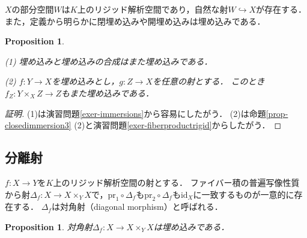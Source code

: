 \documentclass[a4paper,12pt, dvipdfmx]{jsbook}
\def\id{\mathrm{id}}
\theoremstyle{plain}
\newtheorem{prop}[thm]{\bfseries Proposition}
\theoremstyle{definition}
\begin{document}
$X$の部分空間$W$は$K$上のリジッド解析空間であり，自然な射$W\hookrightarrow X$が存在する．
また，定義から明らかに閉埋め込みや開埋め込みは埋め込みである．

\begin{prop}\label{prop-immersion3}{\rm 
(1) 埋め込みと埋め込みの合成はまた埋め込みである．

(2) $f\colon Y\rightarrow X$を埋め込みとし，$g\colon Z\rightarrow X$を任意の射とする．
このとき$f_Z\colon Y\times_XZ\rightarrow Z$もまた埋め込みである．}
\end{prop}

\begin{proof}[証明]
(1)は演習問題\ref{exer-immersions}から容易にしたがう．
(2)は命題\ref{prop-closedimmersion3} (2)と演習問題\ref{exer-fiberproductrigid}からしたがう．
\end{proof}

\subsection{分離射}\label{sub-separatedmorphisms}
$f\colon X\rightarrow Y$を$K$上のリジッド解析空間の射とする．
ファイバー積の普遍写像性質から射$\Delta_f\colon X\rightarrow X\times_YX$で，$\mathrm{pr}_1\circ\Delta_f$も$\mathrm{pr}_2\circ\Delta_f$も$\id_X$に一致するものが一意的に存在する．
$\Delta_f$は対角射（diagonal morphism）と呼ばれる．

\begin{prop}\label{prop-separatedmorphisms1}{\rm 
対角射$\Delta_f\colon X\rightarrow X\times_YX$は埋め込みである．}
\end{prop}
\end{document}
